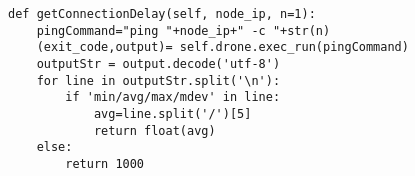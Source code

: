 \begin{lstlisting}[caption={Késleltetés megállapítása a konténer és a node között}, label={lst:ping}]
def getConnectionDelay(self, node_ip, n=1):
	pingCommand="ping "+node_ip+" -c "+str(n)
	(exit_code,output)= self.drone.exec_run(pingCommand)
	outputStr = output.decode('utf-8')
	for line in outputStr.split('\n'):
		if 'min/avg/max/mdev' in line:
			avg=line.split('/')[5]
			return float(avg)
	else:
		return 1000
\end{lstlisting}




